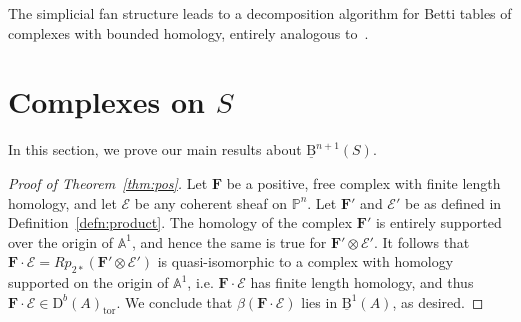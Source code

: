\documentclass[12pt]{amsart}
\theoremstyle{definition}
\theoremstyle{remark}
\newcommand{\PP}{\mathbb{P}}
\renewcommand{\AA}{\mathbb{A}}
\newcommand{\cE}{\mathcal{E}}
\newcommand{\FF}{\mathbf{F}}
\newcommand{\DD}{\mathrm{D}}
\newcommand{\BBQ}{\underline{\mathrm{B}}}
\begin{document}
The simplicial fan structure leads to a decomposition algorithm for Betti tables of complexes with bounded homology, entirely analogous to~\cite[Decomposition Algorithm]{eis-schrey1}.


\section{Complexes on $S$}\label{sec:finite length homology}



In this section, we prove our main results about $\BBQ^{n+1}(S)$.


\begin{proof}[Proof of Theorem~\ref{thm:pos}]
Let $\FF$ be a positive, free complex with finite length homology, and let $\cE$ be any coherent sheaf on $\PP^n$.  Let $\FF'$ and $\cE'$ be as defined in Definition~\ref{defn:product}.  The homology of the complex $\FF'$ is entirely supported over the origin of $\AA^1$, and hence the same is true for $\FF'\otimes \cE'$.  It follows that $\FF\cdot \cE=Rp_{2*}(\FF'\otimes \cE')$ is quasi-isomorphic to a complex with homology supported on the origin of $\AA^1$, i.e. $\FF\cdot \cE$ has finite length homology, and thus $\FF\cdot \cE\in \DD^b(A)_{\text{tor}}$.  We conclude that $\beta(\FF\cdot \cE)$ lies in $\BBQ^1(A)$, as desired.
\end{proof}
\end{document}
